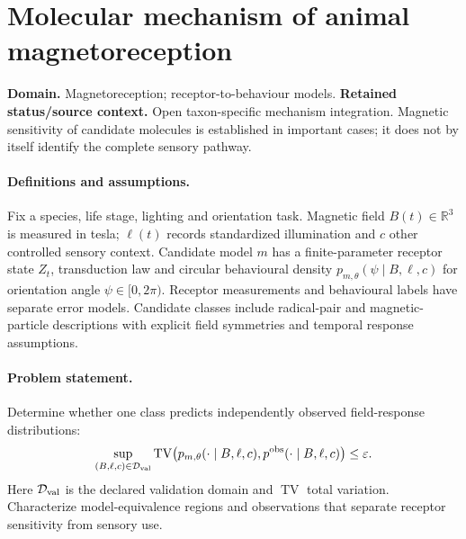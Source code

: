 \documentclass[11pt]{article}
\begin{document}
\section*{Molecular mechanism of animal magnetoreception}
\label{prob:316}
\label{rank:115}
\par\smallskip

\noindent\textbf{Domain.} Magnetoreception; receptor-to-behaviour models. \quad \textbf{Retained status/source context.} Open taxon-specific mechanism integration. Magnetic sensitivity of candidate molecules is established in important cases; it does not by itself identify the complete sensory pathway.

\paragraph{Definitions and assumptions.} Fix a species, life stage, lighting and orientation task. Magnetic field $B(t)\in\mathbb{R}^3$ is measured in tesla; $\ell(t)$ records standardized illumination and $c$ other controlled sensory context. Candidate model $m$ has a finite-parameter receptor state $Z_t$, transduction law and circular behavioural density $p_{m,\theta}(\psi\mid B,\ell,c)$ for orientation angle $\psi\in[0,2\pi)$. Receptor measurements and behavioural labels have separate error models. Candidate classes include radical-pair and magnetic-particle descriptions with explicit field symmetries and temporal response assumptions.

\paragraph{Problem statement.} Determine whether one class predicts independently observed field-response distributions:
    \[\sup_{(B,\ell,c)\in\mathcal D_{\rm val}}\operatorname{TV}\bigl(p_{m,\theta}(\cdot\mid B,\ell,c),
    p^{\rm obs}(\cdot\mid B,\ell,c)\bigr)\leq\varepsilon.\]
    Here $\mathcal D_{\rm val}$ is the declared validation domain and $\operatorname{TV}$ total variation. Characterize model-equivalence regions and observations that separate receptor sensitivity from sensory use.
\end{document}
